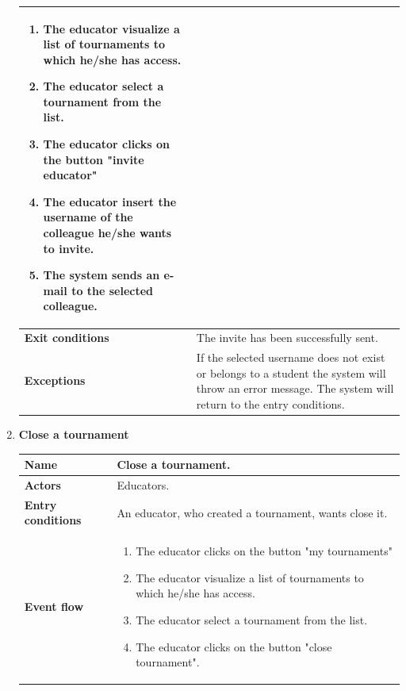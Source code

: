 \begin{enumerate}[label=\textbf{UC.\arabic*}]
\begin{table}[H]
\begin{tabular}{|m{3.2cm}|m{9.8cm}|}
\begin{enumerate}[label=\arabic*.]
                        \item The educator visualize a list of tournaments to which he/she has access.
                        \item The educator select a tournament from the list.
                        \item The educator clicks on the button "invite educator"
                        \item The educator insert the username of the colleague he/she wants to invite.
                        \item The system sends an e-mail to the selected colleague.
                    \end{enumerate}\\
                    \hline
                    \textbf{Exit conditions}  & The invite has been successfully sent. \\
                    \hline
                    \textbf{Exceptions} & If the selected username does not exist or belongs to a student the system will throw an error message. The system will return to the entry conditions.
                \end{tabular}
        \end{table}
        \item {} \textbf{Close a tournament}
        \begin{table}[H]
    	    \centering
                \renewcommand{\arraystretch}{1.5}
                \begin{tabular}{|m{3.2cm}|m{9.8cm}|}
                    \hline
                    \textbf{Name} & Close a tournament. \\
                    \hline
                    \textbf{Actors} & Educators. \\
                    \hline
                    \textbf{Entry conditions}  &  An educator, who created a tournament, wants close it. \\
                    \hline
                    \textbf{Event flow}  & 
                    \begin{enumerate}[label=\arabic*.]
                        \item The educator clicks on the button "my tournaments"
                        \item The educator visualize a list of tournaments to which he/she has access.
                        \item The educator select a tournament from the list.
                        \item The educator clicks on the button "close tournament".

\end{enumerate}
\end{tabular}
\end{table}
\end{enumerate}
